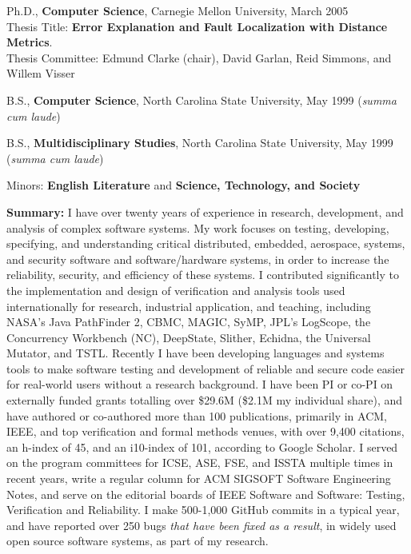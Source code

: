 \documentclass[ComputerScience]{vita}
\begin{document}
\begin{vita}


\begin{Education}
  \item Ph.D., {\bf Computer Science}, Carnegie Mellon University, March 2005\\ Thesis Title:  {\bf Error Explanation and Fault Localization with Distance Metrics}.\\Thesis Committee:  Edmund Clarke (chair), David Garlan, Reid Simmons, and Willem Visser

  \item B.S., {\bf Computer Science}, North Carolina State University, May 1999 (\emph{summa cum laude})
  \item B.S., {\bf Multidisciplinary Studies}, North Carolina State University, May 1999 (\emph{summa cum laude})
\item  \hspace{0.5in} Minors:  {\bf English Literature} and {\bf Science, Technology, and Society}
\end{Education}

\begin{Experience}
\item {\bf Summary:} I have over twenty years of experience in
  research, development, and analysis of complex software systems.  My
  work focuses on testing, developing, specifying, and understanding
  critical distributed, embedded, aerospace, systems, and security
  software and software/hardware systems, in order to increase the
  reliability, security, and efficiency of these systems.  I
  contributed significantly to the implementation and design of
  verification and analysis tools used internationally for research,
  industrial application, and teaching, including NASA's Java
  PathFinder 2, CBMC, MAGIC, SyMP, JPL's LogScope, the Concurrency
  Workbench (NC), DeepState, Slither, Echidna, the Universal Mutator, and TSTL.  Recently I have been developing languages
  and systems tools to make software testing and development of reliable and secure
  code easier for real-world users without a research background.
  I have been PI or co-PI on externally funded grants totalling over
  \$29.6M (\$2.1M my individual share), and have authored or co-authored more than
  100 publications, primarily in ACM, IEEE, and top verification and
  formal methods venues, with over 9,400 citations, an h-index of 45,
  and an i10-index of 101, according to Google Scholar.  I served on
  the program committees for ICSE, ASE, FSE, and ISSTA multiple times in
  recent years, write a regular column for ACM SIGSOFT Software
  Engineering Notes, and serve on the editorial boards of IEEE Software and Software: Testing, Verification and
   Reliability.  I make 500-1,000 GitHub commits in a typical
  year, and have reported over 250 bugs \emph{that have been fixed as a result}, in widely used open source
  software systems, as part of my research.



\end{Experience}
\end{vita}
\end{document}
